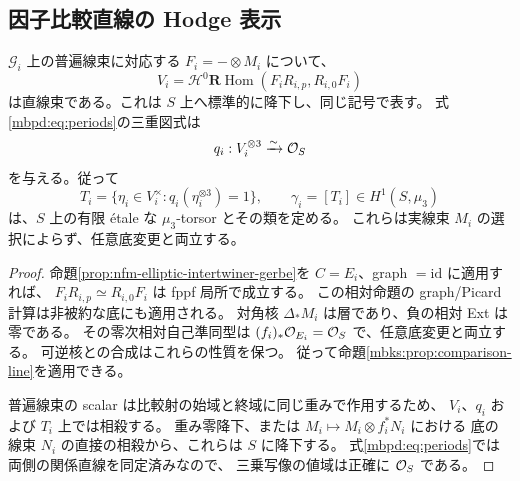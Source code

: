 \subsection{因子比較直線の Hodge 表示}

\begin{lemma}
\label{mbpd:lem:factor-lines}
$\mathscr G_i$ 上の普遍線束に対応する $F_i=-\otimes M_i$ について、
\[
 V_i=\mathcal H^0\mathbf R\operatorname{Hom}
       (F_iR_{i,p},R_{i,0}F_i)
\]
は直線束である。これは $S$ 上へ標準的に降下し、同じ記号で表す。
式\eqref{mbpd:eq:periods}の三重図式は
\[
 q_i:V_i^{\otimes3}\xrightarrow{\sim}\mathcal O_S
\]
を与える。従って
\begin{equation}\label{mbpd:eq:factor-torsors}
 T_i=\{\eta_i\in V_i^\times:q_i(\eta_i^{\otimes3})=1\},
 \qquad \gamma_i=[T_i]\in H^1(S,\mu_3)
\end{equation}
は、$S$ 上の有限 \'etale な $\mu_3$-torsor とその類を定める。
これらは実線束 $M_i$ の選択によらず、任意底変更と両立する。
\end{lemma}
\begin{proof}
命題\ref{prop:nfm-elliptic-intertwiner-gerbe}を
$C=E_i$、graph $=\mathrm{id}$ に適用すれば、
$F_iR_{i,p}\simeq R_{i,0}F_i$ は fppf 局所で成立する。
この相対命題の graph/Picard 計算は非被約な底にも適用される。
対角核 $\Delta_*M_i$ は層であり、負の相対 Ext は零である。
その零次相対自己準同型は $(f_i)_*\mathcal O_{E_i}=\mathcal O_S$ で、任意底変更と両立する。
可逆核との合成はこれらの性質を保つ。
従って命題\ref{mbks:prop:comparison-line}を適用できる。

普遍線束の scalar は比較射の始域と終域に同じ重みで作用するため、
$V_i$、$q_i$ および $T_i$ 上では相殺する。
重み零降下、または $M_i\mapsto M_i\otimes f_i^*N_i$ における
底の線束 $N_i$ の直接の相殺から、これらは $S$ に降下する。
式\eqref{mbpd:eq:periods}では両側の関係直線を同定済みなので、
三乗写像の値域は正確に $\mathcal O_S$ である。
\end{proof}

